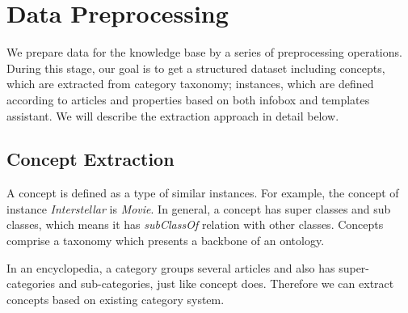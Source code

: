 \documentclass[runningheads,a4paper]{llncs}
\begin{document}
\section{Data Preprocessing}
\label{sec:dp}
We prepare data for the knowledge base by a series of preprocessing operations. During this stage, our goal is to get a structured dataset including concepts, which are extracted from category taxonomy; instances, which are defined according to articles and properties based on both infobox and templates assistant. We will describe the extraction approach in detail below.

\subsection{Concept Extraction}
\label{sec:ce}
A concept is defined as a type of similar instances. For example, the concept of instance \emph{Interstellar} is \emph{Movie}. In general, a concept has super classes and sub classes, which means it has \emph{subClassOf} relation with other classes. Concepts comprise a taxonomy which presents a backbone of an ontology.

In an encyclopedia, a category groups several articles and also has super-categories and sub-categories, just like concept does. Therefore we can extract concepts based on existing category system.
\end{document}

